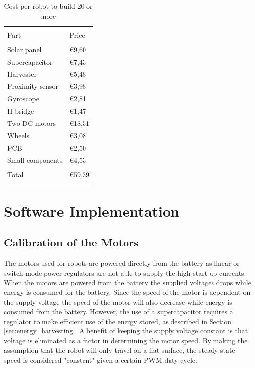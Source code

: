 \begin{table}[t]
	\centering
	\caption{Cost per robot to build 20 or more}
	\label{tab:cost_robot}
	\begin{tabularx}{0.7\textwidth}{l@{\hskip 0.6in}l} 
		\hline
		\\[-1em]
		Part & Price \\
		\hline\hline
		\\[-1em]
		Solar panel & \euro9,60\\
		Supercapacitor & \euro7,43\\
		Harvester & \euro5,48 \\
		Proximity sensor & \euro3,98 \\
		Gyroscope & \euro2,81\\	
		H-bridge & \euro1,47 \\
		Two DC motors & \euro18,51 \\
		Wheels & \euro3,08\\
		PCB & \euro2,50 \\
		Small components & \euro4,53\\
		\hline
		\\[-1em]
		Total & \euro59,39 \\
		\hline
	\end{tabularx}
\end{table}


\section{Software Implementation}

\subsection{Calibration of the Motors}

The motors used for robots are powered directly from the battery as linear or switch-mode power regulators are not able to supply the high start-up currents.
When the motors are powered from the battery the supplied voltages drops while energy is consumed for the battery.
Since the speed of the motor is dependent on the supply voltage the speed of the motor will also decrease while energy is consumed from the battery.
However, the use of a supercapacitor requires a regulator to make efficient use of the energy stored, as described in Section \ref{sec:energy_harvesting}.
A benefit of keeping the supply voltage constant is that voltage is eliminated as a factor in determining the motor speed.
By making the assumption that the robot will only travel on a flat surface, the steady state speed is considered "constant" given a certain PWM duty cycle.


